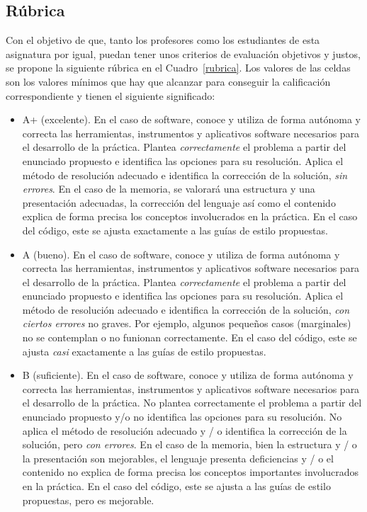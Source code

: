 \documentclass{unizarpractice}
\begin{document}
\subsection{Rúbrica}
Con el objetivo de que, tanto los profesores como los estudiantes de esta asignatura por igual, puedan tener unos criterios de evaluación objetivos y justos, se propone la siguiente rúbrica en el Cuadro~\ref{rubrica}. Los valores de las celdas son los valores mínimos que hay que alcanzar para conseguir la calificación correspondiente y tienen el siguiente significado:

\begin{itemize}[topsep=-0.5\baselineskip]
\item A+ (excelente). En el caso de software, conoce y utiliza de forma autónoma y correcta las herramientas, instrumentos y aplicativos software necesarios para el desarrollo de la práctica. Plantea \emph{correctamente} el problema a partir del enunciado propuesto e identifica las opciones para su resolución. Aplica el método de resolución adecuado e identifica la corrección de la solución, \emph{sin errores}. En el caso de la memoria, se valorará
una estructura y una presentación adecuadas, la corrección del lenguaje así como el contenido explica de forma precisa  los conceptos involucrados en la práctica.
En el caso del código, este se ajusta exactamente a las guías de estilo propuestas. 

\item A (bueno). En el caso de software, conoce y utiliza de forma autónoma y correcta las herramientas, instrumentos y aplicativos software necesarios para el desarrollo de la práctica. Plantea \emph{correctamente} el problema a partir del enunciado propuesto e identifica las opciones para su resolución. Aplica el método de resolución adecuado e identifica la corrección de la solución, \emph{con ciertos errores} no graves. Por ejemplo, algunos pequeños casos (marginales) no se contemplan o no funionan correctamente.
En el caso del código, este se ajusta \emph{casi} exactamente a las guías de estilo propuestas. 

\item B (suficiente). En el caso de software, conoce y utiliza de forma autónoma y correcta las herramientas, instrumentos y aplicativos software necesarios para el desarrollo de la práctica. No plantea correctamente el problema a partir del enunciado propuesto y/o no identifica las opciones para su resolución. No aplica el método de resolución adecuado y / o identifica la corrección de la solución, pero \emph{con errores}. En el caso de la memoria, bien
la estructura y / o la presentación son mejorables, el lenguaje presenta deficiencias y / o el contenido no explica de forma precisa los conceptos importantes involucrados en la práctica. En el caso del código, este se ajusta a las guías de estilo propuestas, pero es mejorable.


\end{itemize}
\end{document}
